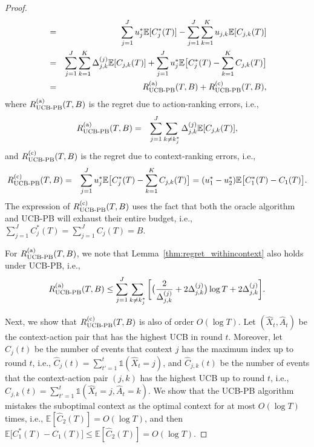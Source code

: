 \begin{proof}
\begin{eqnarray}
&=& \sum_{j = 1}^J u_j^* \mathbb{E}[C_j^*(T)] - \sum_{j = 1}^J \sum_{k =1}^K u_{j,k} \mathbb{E}[C_{j,k}(T)] \nonumber\\
& =& \sum_{j=1}^J \sum_{k=1}^K \Delta^{(j)}_{j,k}\mathbb{E}[C_{j,k}(T)] + \sum_{j = 1}^J u_j^* \mathbb{E}\big[C_j^*(T) -\sum_{k=1}^K C_{j,k}(T)\big]\nonumber \\
& =& R_{\text{UCB-PB}}^{\rm (a)}(T, B) + R_{\text{UCB-PB}}^{\rm (c)}(T, B),
\end{eqnarray}
where $R_{\text{UCB-PB}}^{\rm (a)}(T, B)$ is the regret due to action-ranking errors, i.e.,
\begin{eqnarray}
R_{\text{UCB-PB}}^{\rm (a)}(T, B) &=& \sum_{j=1}^J \sum_{k\neq k_j^*} \Delta^{(j)}_{j,k}\mathbb{E}[C_{j,k}(T)], \nonumber
\end{eqnarray}
and $R_{\text{UCB-PB}}^{\rm (c)}(T, B)$ is the regret due to context-ranking errors, i.e.,
\begin{eqnarray} \label{eq:regret_ucb_dp_context}
R_{\text{UCB-PB}}^{\rm (c)}(T, B) &=& \sum_{j = 1}^J u_j^* \mathbb{E}\big[C_j^*(T) -\sum_{k=1}^K C_{j,k}(T)\big] =(u_1^* - u_2^*) \mathbb{E}\big[C_1^*(T) - C_1(T)\big]. 
\end{eqnarray}
The expression of $R_{\text{UCB-PB}}^{\rm (c)}(T, B)$ uses the fact that both the oracle algorithm and UCB-PB  will exhaust their entire budget, i.e., $\sum_{j=1}^J C_j^*(T) = \sum_{j=1}^J C_j(T) = B$.

For $R_{\text{UCB-PB}}^{\rm (a)}(T, B)$, we note that  Lemma~\ref{thm:regret_withincontext} also holds under UCB-PB, i.e.,
\begin{eqnarray} \label{eq:regret_ucb_dp_action}
R_{\text{UCB-PB}}^{\rm (a)}(T, B)
\leq \sum_{j=1}^J \sum_{k \neq k_j^*} \bigg[\big(\frac{2}{\Delta_{j,k}^{(j)}} + 2\Delta_{j,k}^{(j)}\big) \log T + 2 \Delta_{j,k}^{(j)}\bigg].
\end{eqnarray}

Next, we show that $R_{\text{UCB-PB}}^{\rm (c)}(T, B)$ is also of order $O(\log T)$.
Let $(\hat{X}_t, \hat{A}_t)$ be the context-action pair that has the highest UCB in round $t$. Moreover, let $\hat{C}_j(t)$ be the number of events that context $j$ has the maximum index up to round $t$, i.e., $\hat{C}_j(t) = \sum_{t' = 1}^{t}\mathds{1}(\hat{X}_t = j)$, and $\hat{C}_{j,k}(t)$ be the number of events that the context-action pair $(j,k)$ has the highest UCB up to round $t$, i.e., $\hat{C}_{j,k}(t) = \sum_{t' = 1}^{t}\mathds{1}(\hat{X}_t = j, \hat{A}_t = k)$. We show that the UCB-PB algorithm mistakes the suboptimal context as the optimal context for at most $O(\log T)$ times, i.e., $\mathbb{E} [\hat{C}_2(T)] = O(\log T)$, and then $\mathbb{E}\big[C_1^*(T) - C_1(T)\big] \leq \mathbb{E} [\hat{C}_2(T)] = O(\log T)$.


\end{proof}
